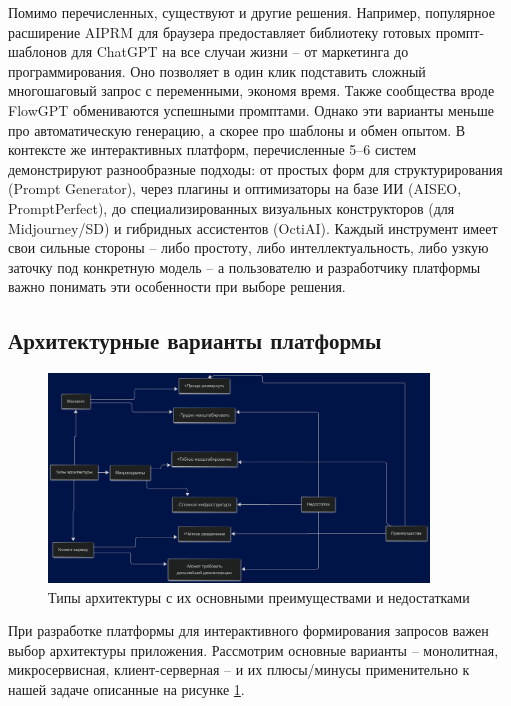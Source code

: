 Помимо перечисленных, существуют и другие решения. Например, популярное расширение AIPRM для браузера предоставляет библиотеку готовых промпт-шаблонов для ChatGPT на все случаи жизни – от маркетинга до программирования. Оно позволяет в один клик подставить сложный многошаговый запрос с переменными, экономя время. Также сообщества вроде FlowGPT обмениваются успешными промптами. Однако эти варианты меньше про автоматическую генерацию, а скорее про шаблоны и обмен опытом. В контексте же интерактивных платформ, перечисленные 5–6 систем демонстрируют разнообразные подходы: от простых форм для структурирования (Prompt Generator), через плагины и оптимизаторы на базе ИИ (AISEO, PromptPerfect), до специализированных визуальных конструкторов (для Midjourney/SD) и гибридных ассистентов (OctiAI). Каждый инструмент имеет свои сильные стороны – либо простоту, либо интеллектуальность, либо узкую заточку под конкретную модель – а пользователю и разработчику платформы важно понимать эти особенности при выборе решения.
\subsection{Архитектурные варианты платформы}
\begin{figure}[htbp]
    \centering
    \includegraphics[width=0.9\textwidth]{picture/diploma_architecture_prototypes.png}
    \caption{Типы архитектуры с их основными преимуществами и недостатками}
    \label{architecture_prototypes}
\end{figure}
При разработке платформы для интерактивного формирования запросов важен выбор архитектуры приложения. Рассмотрим основные варианты – монолитная, микросервисная, клиент-серверная – и их плюсы/минусы применительно к нашей задаче описанные на рисунке \ref{architecture_prototypes}.

